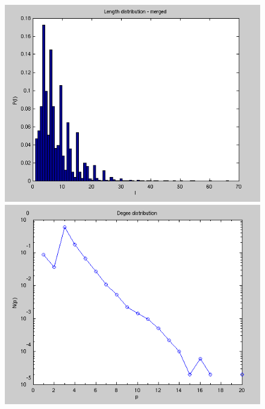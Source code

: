 \begin{figure}[h!]
\begin{minipage}{0.32\textwidth}
\begin{center}
\includegraphics[width=1.0\textwidth]{Figures/chapter-image/avizo/ActinZ39b21l5-histo-length.png}%
\end{center}
\end{minipage}
\begin{minipage}{0.32\textwidth}
\begin{center}
\includegraphics[width=1.0\textwidth]{Figures/chapter-image/avizo/ActinZ39b21l5-histo-degree.png}%
\end{center}
\end{minipage}

\end{figure}
